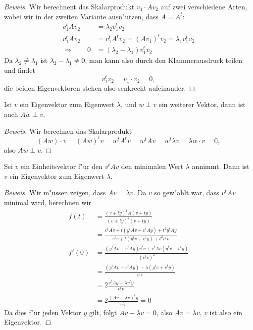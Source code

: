 \begin{proof}[Beweis]
Wir berechnent das Skalarprodukt $v_1\cdot Av_2$ auf zwei verschiedene
Arten, wobei wir in der zweiten Variante ausn"utzen, dass $A=A^t$:
\begin{align*}
v_1^tAv_2&=\lambda_2v_1^tv_2
\\
v_1^tAv_2&=v_1^tA^tv_2=(Av_1)^tv_2=\lambda_1v_1^tv_2
\\
\Rightarrow
\qquad
0&=(\lambda_2-\lambda_1)v_1^tv_2
\end{align*}
Da $\lambda_2\ne\lambda_1$ ist $\lambda_2-\lambda_1\ne 0$, man kann
also durch den Klammerausdruck teilen und findet
$$v_1^tv_2=v_1\cdot v_2=0,$$
die beiden Eigenvektoren stehen also senkrecht aufeinander.
\end{proof}

\begin{hilfssatz}
\label{ev-ortho}
Ist $v$ ein Eigenvektor zum Eigenwert $\lambda$, und $w\perp v$ ein weiterer
Vektor, dann ist auch $Aw\perp v$.
\end{hilfssatz}

\begin{proof}[Beweis]
Wir berechnen das Skalarprodukt
$$
(Aw)\cdot v=(Aw)^t v=w^tA^tv=w^tAv=w^t\lambda v=\lambda w\cdot v=0,
$$
also $Aw\perp v$.
\end{proof}

\begin{hilfssatz}
\label{ev-existenz}
Sei $v$ ein Einheitsvektor f"ur den $v^tAv$ den minimalen Wert $\lambda$ annimmt.
Dann ist $v$ ein Eigenvektor zum Eigenwert $\lambda$.
\end{hilfssatz}

\begin{proof}[Beweis]
Wir m"ussen zeigen, dass $Av=\lambda v$. Da $v$ so gew"ahlt war, dass
$v^tAv$ minimal wird, berechnen wir 
\begin{align*}
f(t)&=\frac{(v+ty)^tA(v+ty)}{(v+ty)^t(v+ty)}
\\
&=
\frac{v^tAv+t(y^tAv+v^tAy)+t^2y^tAy}{v^tv+t(y^tv+v^ty)+t^2v^tv}
\\
f'(0)
&=
\frac{ (y^tAv+v^tAy)v^tv + v^tAv(y^tv+v^ty) }{ (v^tv)^2 }
\\
&=
\frac{ (y^tAv+v^tAy) - \lambda (y^tv+v^ty) }{ v^tv }
\\
&=
2\frac{ v^tAy - \lambda v^ty }{ v^tv }
\\
&=
2\frac{ (Av - \lambda v)^ty }{ v^tv }=0
\end{align*}
Da dies f"ur jeden Vektor $y$ gilt, folgt $Av-\lambda v=0$, also
$Av=\lambda v$, $v$ ist also ein Eigenvektor.
\end{proof}

